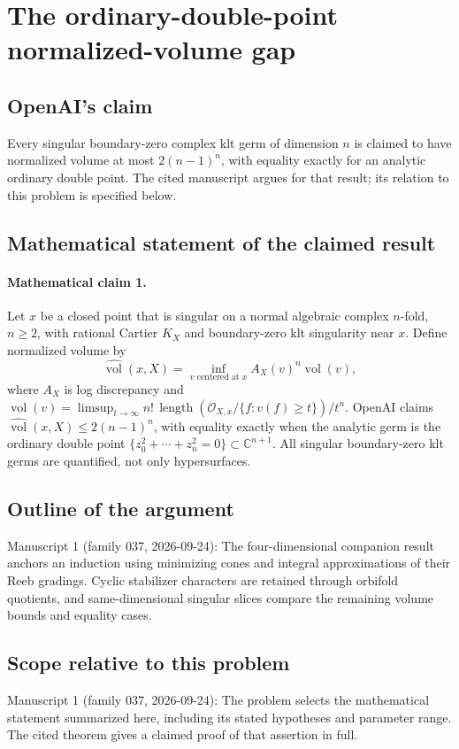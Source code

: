 \documentclass[11pt]{article}
\begin{document}
\section*{The ordinary-double-point normalized-volume gap}

\subsection{OpenAI's claim}
Every singular boundary-zero complex klt germ of dimension $n$ is claimed to have normalized volume at most $2(n-1)^n$, with equality exactly for an analytic ordinary double point. The cited manuscript argues for that result; its relation to this problem is specified below.

\subsection{Mathematical statement of the claimed result}
\paragraph{Mathematical claim 1.} Let $x$ be a closed point that is singular on a normal algebraic complex $n$-fold, $n\ge2$, with rational Cartier $K_X$ and boundary-zero klt singularity near $x$. Define normalized volume by
\[
\widehat{\operatorname{vol}}(x,X)=\inf_{v\text{ centered at }x}A_X(v)^n\operatorname{vol}(v),
\]
where $A_X$ is log discrepancy and $\operatorname{vol}(v)=\limsup_{t\to\infty}n!\,\operatorname{length}(\mathcal O_{X,x}/\{f:v(f)\ge t\})/t^n$. OpenAI claims $\widehat{\operatorname{vol}}(x,X)\le2(n-1)^n$, with equality exactly when the analytic germ is the ordinary double point $\{z_0^2+\cdots+z_n^2=0\}\subset\mathbb C^{n+1}$. All singular boundary-zero klt germs are quantified, not only hypersurfaces.

\subsection{Outline of the argument}
Manuscript 1 (family 037, 2026-09-24): The four-dimensional companion result anchors an induction using minimizing cones and integral approximations of their Reeb gradings. Cyclic stabilizer characters are retained through orbifold quotients, and same-dimensional singular slices compare the remaining volume bounds and equality cases.

\subsection{Scope relative to this problem}
Manuscript 1 (family 037, 2026-09-24): The problem selects the mathematical statement summarized here, including its stated hypotheses and parameter range. The cited theorem gives a claimed proof of that assertion in full.
\end{document}
